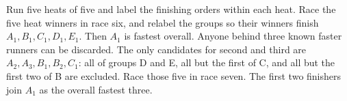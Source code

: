 Run five heats of five and label the finishing orders within each heat. Race the five heat winners in race six, and relabel the groups so their winners finish $A_1,B_1,C_1,D_1,E_1$. Then $A_1$ is fastest overall. Anyone behind three known faster runners can be discarded. The only candidates for second and third are $A_2,A_3,B_1,B_2,C_1$: all of groups D and E, all but the first of C, and all but the first two of B are excluded. Race those five in race seven. The first two finishers join $A_1$ as the overall fastest three.
